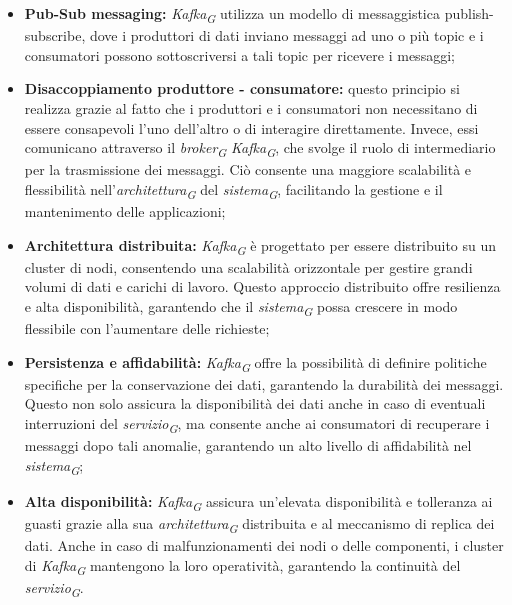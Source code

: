 \begin{itemize}
  \item \textbf{Pub-Sub messaging:} \textit{Kafka}\textsubscript{\textit{G}} utilizza un modello di messaggistica publish-subscribe, dove i produttori di dati inviano messaggi ad uno o più topic e i consumatori possono sottoscriversi a tali topic per ricevere i messaggi;
  
  \item \textbf{Disaccoppiamento produttore - consumatore:} questo principio si realizza grazie al fatto che i produttori e i consumatori non necessitano di essere consapevoli l'uno dell'altro o di interagire direttamente. Invece, essi comunicano attraverso il \textit{broker}\textsubscript{\textit{G}} \textit{Kafka}\textsubscript{\textit{G}}, che svolge il ruolo di intermediario per la trasmissione dei messaggi. Ciò consente una maggiore scalabilità e flessibilità nell'\textit{architettura}\textsubscript{\textit{G}} del \textit{sistema}\textsubscript{\textit{G}}, facilitando la gestione e il mantenimento delle applicazioni;
  
  \item \textbf{Architettura distribuita:} \textit{Kafka}\textsubscript{\textit{G}} è progettato per essere distribuito su un cluster di nodi, consentendo una scalabilità orizzontale per gestire grandi volumi di dati e carichi di lavoro. Questo approccio distribuito offre resilienza e alta disponibilità, garantendo che il \textit{sistema}\textsubscript{\textit{G}} possa crescere in modo flessibile con l'aumentare delle richieste;
  
  \item \textbf{Persistenza e affidabilità:} \textit{Kafka}\textsubscript{\textit{G}} offre la possibilità di definire politiche specifiche per la conservazione dei dati, garantendo la durabilità dei messaggi. Questo non solo assicura la disponibilità dei dati anche in caso di eventuali interruzioni del \textit{servizio}\textsubscript{\textit{G}}, ma consente anche ai consumatori di recuperare i messaggi dopo tali anomalie, garantendo un alto livello di affidabilità nel \textit{sistema}\textsubscript{\textit{G}};
  
  \item \textbf{Alta disponibilità:} \textit{Kafka}\textsubscript{\textit{G}} assicura un'elevata disponibilità e tolleranza ai guasti grazie alla sua \textit{architettura}\textsubscript{\textit{G}} distribuita e al meccanismo di replica dei dati. Anche in caso di malfunzionamenti dei nodi o delle componenti, i cluster di \textit{Kafka}\textsubscript{\textit{G}} mantengono la loro operatività, garantendo la continuità del \textit{servizio}\textsubscript{\textit{G}}.
\end{itemize}

